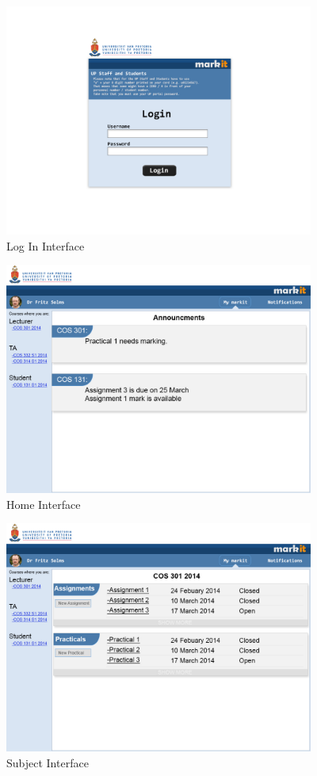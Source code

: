 \documentclass[12pt]{article}
\begin{document}
			\begin{center}
			
			
						\begin{figure}[h]
										\centering
										\includegraphics[width=4in, height=3in]{Pictures/Screens/Desktop/01logon.jpg}
										\caption{Log In Interface}
						\end{figure}
						\FloatBarrier
						
						\begin{figure}[h]
										\centering
										\includegraphics[width=4in, height=3in]{Pictures/Screens/Desktop/02homePage.jpg}
										\caption{Home Interface}
						\end{figure}
						\FloatBarrier
						
						\begin{figure}[h]
										\centering
										\includegraphics[width=4in, height=3in]{Pictures/Screens/Desktop/03subject.jpg}
										\caption{Subject Interface}
						\end{figure}
						\FloatBarrier
						

\end{center}
\end{document}
